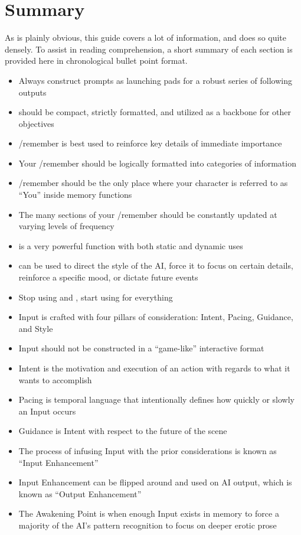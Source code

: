 \documentclass[Source-main.tex]{subfiles}
\begin{document}
\chapter{Summary}
\label{ch:summary}

As is plainly obvious, this guide covers a lot of information, and does so quite densely.
To assist in reading comprehension, a short summary of each section is provided here in chronological bullet point format.

\begin{itemize}

\item{Always construct prompts as launching pads for a robust series of following outputs}

\item{\wi should be compact, strictly formatted, and utilized as a backbone for other objectives}

\item{/remember is best used to reinforce key details of immediate importance}
\item{Your /remember should be logically formatted into categories of information}
\item{/remember should be the only place where your character is referred to as “You” inside memory functions}
\item{The many sections of your /remember should be constantly updated at varying levels of frequency}

\item{\an is a very powerful function with both static and dynamic uses} 
\item{\an can be used to direct the style of the AI, force it to focus on certain details, reinforce a specific mood, or dictate future events}

\item{Stop using \Do and \say, start using \story for everything}
\item{Input is crafted with four pillars of consideration: Intent, Pacing, Guidance, and Style}
\item{Input should not be constructed in a “game-like” interactive format}
\item{Intent is the motivation and execution of an action with regards to what it wants to accomplish}
\item{Pacing is temporal language that intentionally defines how quickly or slowly an Input occurs}
\item{Guidance is Intent with respect to the future of the scene}
\item{The process of infusing Input with the prior considerations is known as “Input Enhancement”}
\item{Input Enhancement can be flipped around and used on AI output, which is known as “Output Enhancement”}
\item{The Awakening Point is when enough Input exists in memory to force a majority of the AI's pattern recognition to focus on deeper erotic prose}


\end{itemize}
\end{document}

